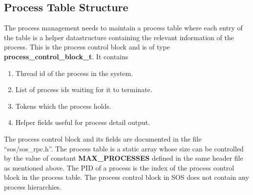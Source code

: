 \documentclass[a4paper, 11pt]{article}
\begin{document}
\subsection{Process Table Structure}
The process management needs to maintain a process table where each
entry of the table is a helper datastructure containing the relevant
information of the process. This is the process control block and is
of type {\bf process\_control\_block\_t}. It contains
\begin{enumerate}
\item Thread id of the process in the system.
\item List of process ids waiting for it to terminate.
\item Tokens which the process holds.
\item Helper fields useful for process detail output. 
\end{enumerate}
The process control block and its fields are documented in the file
``sos/sos\_rpc.h''. The process table is a static array whose size can
be controlled by the value of constant {\bf MAX\_PROCESSES} defined in
the same header file as mentioned above. The PID of a process is the
index of the process control block in the process table. The process
control block in SOS does not contain any process hierarchies.
\end{document}
